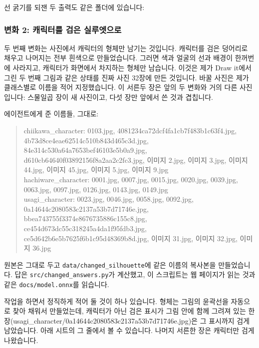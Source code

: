 \documentclass[11pt]{article}
\begin{document}

선 굵기를 되잰 두 출력도 같은 폴더에 있습니다:



\subsubsection*{변화 2: 캐릭터를 검은 실루엣으로}

두 번째 변화는 사진에서 캐릭터의 형체만 남기는 것입니다. 캐릭터를 검은 덩어리로
채우고 나머지는 전부 흰색으로 만들었습니다. 그러면 색과 얼굴의 선과 배경이
한꺼번에 사라지고, 캐릭터가 화면에서 차지하는 형체만 남습니다. 이것은 제가
Draw it에서 그린 두 번째 그림과 같은 상태를 진짜 사진 32장에 만든 것입니다.
바꿀 사진은 제가 클래스별로 이름을 적어 지정했습니다. 이 서른두 장은 앞의 두
변화와 거의 다른 사진입니다: 스물일곱 장이 새 사진이고, 다섯 장만 앞에서 쓴
것과 겹칩니다.

에이전트에게 준 이름들, 그대로:
\begin{quote}\small
chiikawa\_character: 0103.jpg, 4081234ca72dcf4fa1cb7f483b1c63f4.jpg,
4b73d8ce4eae62514c510b843d465c3d.jpg, 84e314c530a64a7653bef46103e5b0a9.jpg,
d610cb64640f03892156f8a2aa2c2fc3.jpg, 이미지 2.jpg, 이미지 3.jpg, 이미지 44.jpg,
이미지 45.jpg, 이미지 5.jpg, 이미지 9.jpg\\
hachiware\_character: 0001.jpg, 0007.jpg, 0015.jpg, 0020.jpg, 0039.jpg,
0063.jpg, 0097.jpg, 0126.jpg, 0143.jpg, 0149.jpg\\
usagi\_character: 0023.jpg, 0046.jpg, 0058.jpg, 0092.jpg,
0a14644c2080583c2137a53b7d71746e.jpg, bbea743755f3374e8676735886c155c8.jpg,
ce454d673dc55c318245a4da1f95fdb3.jpg, ce5d642b6e5b7625f6b1c95d48369b8d.jpg,
이미지 31.jpg, 이미지 32.jpg, 이미지 36.jpg
\end{quote}

원본은 그대로 두고 \texttt{data/changed\_silhouette}에 같은 이름의 복사본을
만들었습니다. 답은 \texttt{src/changed\_answers.py}가 계산했고, 이 스크립트는
웹 페이지가 읽는 것과 같은 \texttt{docs/model.onnx}를 읽습니다.

작업을 하면서 정직하게 적어 둘 것이 하나 있습니다. 형체는 그림의 윤곽선을
자동으로 찾아 채워서 만들었는데, 캐릭터가 아닌 검은 표시가 그림 안에 함께
그려져 있는 한 장(usagi\_character/0a14644c2080583c2137a53b7d71746e.jpg)은 그
표시까지 검게 남았습니다. 아래 시트의 그 줄에서 볼 수 있습니다. 나머지 서른한
장은 캐릭터만 검게 나왔습니다.
\end{document}
